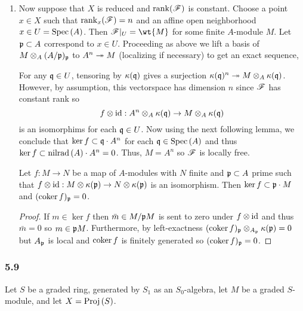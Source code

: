 \documentclass[12pt]{article}
\begin{document}
\begin{enumerate}
\item Now suppose that $X$ is reduced and $\operatorname{\mathrm{rank}}(\mathscr{F})$ is constant. Choose a point $x \in X$ such that $\operatorname{\mathrm{rank}}_x(\mathscr{F}) = n$ and an affine open neighborhood $x \in U = \mathrm{Spec}\left( A \right)$. Then $\F|_U = \wt{M}$ for some finite $A$-module $M$. Let $\mathfrak{p} \subset A$ correspond to $x \in U$. Proceeding as above we lift a basis of $M \otimes_A (A/\mathfrak{p})_{\mathfrak{p}}$ to $A^n \twoheadrightarrow M$ (localizing if necessary) to get an exact sequence,
\begin{center}
\end{center}
For any $\mathfrak{q} \in U$, tensoring by $\kappa(\mathfrak{q})$ gives a surjection $\kappa(\mathfrak{q})^n \twoheadrightarrow M \otimes_{A} \kappa(\mathfrak{q})$. However, by assumption, this vectorspace has dimension $n$ since $\mathscr{F}$ has constant rank so
\[ f \otimes \mathrm{id} : A^n \otimes_{A} \kappa(\mathfrak{q}) \to M \otimes_{A} \kappa(\mathfrak{q}) \]
is an isomorphims for each $\mathfrak{q} \in U$. 
Now using the next following lemma, we conclude that $\ker{f} \subset \mathfrak{q} \cdot A^n$ for each $\mathfrak{q} \in \mathrm{Spec}\left( A \right)$ and thus $\ker{f} \subset \mathrm{nilrad}\left( A \right) \cdot A^n = 0$. Thus, $M = A^n$ so $\mathscr{F}$ is locally free.

\begin{lemma}
Let $f : M \to N$ be a map of $A$-modules with $N$ finite and $\mathfrak{p} \subset A$ prime such that $f \otimes \mathrm{id} : M \otimes \kappa(\mathfrak{p}) \to N \otimes \kappa(\mathfrak{p})$ is an isomorphism. Then $\ker{f} \subset \mathfrak{p} \cdot M$ and $(\operatorname{\mathrm{coker}}{f})_{\mathfrak{p}} = 0$.
\end{lemma}

\begin{proof}
If $m \in \ker{f}$ then $\bar{m} \in M/\mathfrak{p} M$ is sent to zero under $f \otimes \mathrm{id}$ and thus $\bar{m} = 0$ so $m \in \mathfrak{p} M$. Furthermore, by left-exactness $(\operatorname{\mathrm{coker}}{f})_{\mathfrak{p}} \otimes_{A_{\mathfrak{p}}} \kappa(\mathfrak{p}) = 0$ but $A_{\mathfrak{p}}$ is local and $\operatorname{\mathrm{coker}}{f}$ is finitely generated so $(\operatorname{\mathrm{coker}}{f})_{\mathfrak{p}} = 0$. 
\end{proof}
\end{enumerate}

\subsubsection{5.9}

\newcommand{\sS}{\mathscr{S}}

Let $S$ be a graded ring, generated by $S_1$ as an $S_0$-algebra, let $M$ be a graded $S$-module, and let $X = \mathrm{Proj}\left( S \right)$. 
\end{document}
